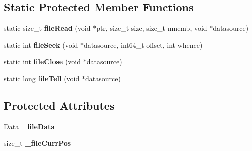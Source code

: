 \subsection*{Static Protected Member Functions}
\begin{DoxyCompactItemize}
\item 
\mbox{\label{classcocos2d_1_1experimental_1_1AudioDecoder_a99f9d1d2efbfeb2ea65c80182a97bef4}} 
static size\+\_\+t {\bfseries file\+Read} (void $\ast$ptr, size\+\_\+t size, size\+\_\+t nmemb, void $\ast$datasource)
\item 
\mbox{\label{classcocos2d_1_1experimental_1_1AudioDecoder_a567c8be3efd6952fed3193ec5b6f8d32}} 
static int {\bfseries file\+Seek} (void $\ast$datasource, int64\+\_\+t offset, int whence)
\item 
\mbox{\label{classcocos2d_1_1experimental_1_1AudioDecoder_a1df7b0981cba25bd0dd4807c2ad1ecf8}} 
static int {\bfseries file\+Close} (void $\ast$datasource)
\item 
\mbox{\label{classcocos2d_1_1experimental_1_1AudioDecoder_a542c503615e026d19743a3b8e1c18609}} 
static long {\bfseries file\+Tell} (void $\ast$datasource)
\end{DoxyCompactItemize}
\subsection*{Protected Attributes}
\begin{DoxyCompactItemize}
\item 
\mbox{\label{classcocos2d_1_1experimental_1_1AudioDecoder_ab902f80f11163a1dde5c61c44f291c45}} 
\hyperlink{classData}{Data} {\bfseries \+\_\+file\+Data}
\item 
\mbox{\label{classcocos2d_1_1experimental_1_1AudioDecoder_a8a4482af9378c1b08ba37283242e70ef}} 
size\+\_\+t {\bfseries \+\_\+file\+Curr\+Pos}
\end{DoxyCompactItemize}
